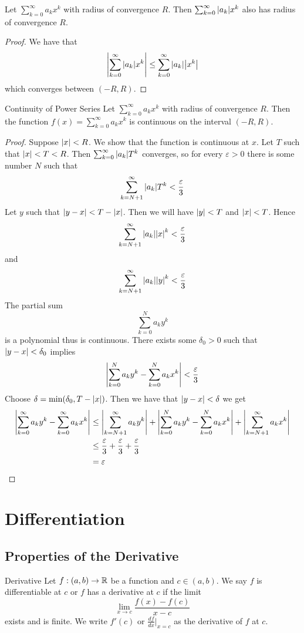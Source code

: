 \documentclass[a4paper]{article}
\begin{document}
\begin{prp}{}{} Let $\sum_{k=0}^{\infty}a_kx^k$ with radius of convergence $R$. Then $\sum_{k=0}^{\infty}\abs{a_k}x^k$ also has radius of convergence $R$. \tcbline
\begin{proof} We have that $$\abs{\sum_{k=0}^{\infty}\abs{a_k}x^k}\leq\sum_{k=0}^{\infty}\abs{a_k}\abs{x^k}$$ which converges between $(-R,R)$. 
\end{proof}
\end{prp}

\begin{thm}{Continuity of Power Series}{} Let $\sum_{k=0}^{\infty}a_kx^k$ with radius of convergence $R$. Then the function $f(x)=\sum_{k=0}^{\infty}a_kx^k$ is continuous on the interval $(-R,R)$. \tcbline
\begin{proof} Suppose $\abs{x}<R$. We show that the function is continuous at $x$. Let $T$ such that $\abs{x}<T<R$. Then $\sum_{k=0}^\infty\abs{a_k}T^k$ converges, so for every $\varepsilon>0$ there is some number $N$ such that $$\sum_{k=N+1}^\infty\abs{a_k}T^k<\frac{\varepsilon}{3}$$ Let $y$ such that $\abs{y-x}<T-\abs{x}$. Then we will have $\abs{y}<T$ and $\abs{x}<T$. Hence $$\sum_{k=N+1}^\infty\abs{a_k}\abs{x}^k<\frac{\varepsilon}{3}$$ and $$\sum_{k=N+1}^\infty\abs{a_k}\abs{y}^k<\frac{\varepsilon}{3}$$ The partial sum $$\sum_{k=0}^Na_ky^k$$ is a polynomial thus is continuous. There exists some $\delta_0>0$ such that $\abs{y-x}<\delta_0$ implies $$\abs{\sum_{k=0}^Na_ky^k-\sum_{k=0}^Na_kx^k}<\frac{\varepsilon}{3}$$ Choose $\delta=\min(\delta_0,T-\abs{x})$. Then we have that $\abs{y-x}<\delta$ we get 
\begin{align*}
\abs{\sum_{k=0}^\infty a_ky^k-\sum_{k=0}^\infty a_kx^k}&\leq\abs{\sum_{k=N+1}^\infty a_ky^k}+\abs{\sum_{k=0}^Na_ky^k-\sum_{k=0}^Na_kx^k}+\abs{\sum_{k=N+1}^\infty a_kx^k}\\
&\leq\frac{\varepsilon}{3}+\frac{\varepsilon}{3}+\frac{\varepsilon}{3}\\
&=\varepsilon
\end{align*}
\end{proof}
\end{thm}

\pagebreak
\section{Differentiation}
\subsection{Properties of the Derivative}
\begin{defn}{Derivative}{} Let $f:(a,b)\to\mathbb{R}$ be a function and $c\in(a,b)$. We say $f$ is differentiable at $c$ or $f$ has a derivative at $c$ if the limit $$\lim_{x\to c}\frac{f(x)-f(c)}{x-c}$$ exists and is finite. We write $f'(c)$ or $\frac{df}{dx}\vert_{x=c}$ as the derivative of $f$ at $c$. 
\end{defn}
\end{document}
